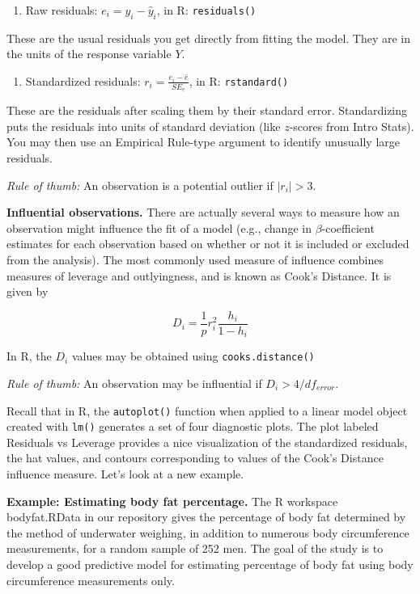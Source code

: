 \documentclass[
]{book}
\providecommand{\tightlist}{%
  \setlength{\itemsep}{0pt}\setlength{\parskip}{0pt}}
\begin{document}
\begin{enumerate}
\def\labelenumi{\arabic{enumi}.}
\tightlist
\item
  Raw residuals: \(e_i = y_i - \hat{y}_i\), in R: \texttt{residuals()}
\end{enumerate}

These are the usual residuals you get directly from fitting the model. They are in the units of the response variable \(Y\).

\begin{enumerate}
\def\labelenumi{\arabic{enumi}.}
\setcounter{enumi}{1}
\tightlist
\item
  Standardized residuals: \(r_i = \displaystyle\frac{e_i - \bar{e}}{SE_e}\), in R: \texttt{rstandard()}
\end{enumerate}

These are the residuals after scaling them by their standard error. Standardizing puts the residuals into units of standard deviation (like \(z\)-scores from Intro Stats). You may then use an Empirical Rule-type argument to identify unusually large residuals.

\emph{Rule of thumb:} An observation is a potential outlier if \(|r_i| > 3\).

\textbf{Influential observations.} There are actually several ways to measure how an observation might influence the fit of a model (e.g., change in \(\beta\)-coefficient estimates for each observation based on whether or not it is included or excluded from the analysis). The most commonly used measure of influence combines measures of leverage and outlyingness, and is known as Cook's Distance. It is given by

\[D_i = \frac{1}{p}r_i^2\frac{h_i}{1-h_i}\]

In R, the \(D_i\) values may be obtained using \texttt{cooks.distance()}

\emph{Rule of thumb:} An observation may be influential if \(D_i > 4/{df}_{error}\).

Recall that in R, the \texttt{autoplot()} function when applied to a linear model object created with \texttt{lm()} generates a set of four diagnostic plots. The plot labeled Residuals vs Leverage provides a nice visualization of the standardized residuals, the hat values, and contours corresponding to values of the Cook's Distance influence measure. Let's look at a new example.

\textbf{Example: Estimating body fat percentage.} The R workspace bodyfat.RData in our repository gives the percentage of body fat determined by the method of underwater weighing, in addition to numerous body circumference measurements, for a random sample of 252 men. The goal of the study is to develop a good predictive model for estimating percentage of body fat using body circumference measurements only.
\end{document}
